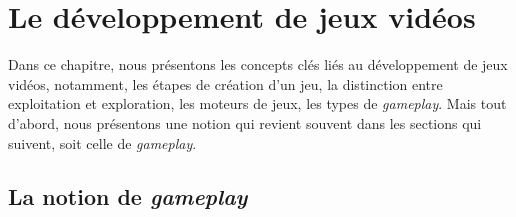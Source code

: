 \chapter{Le développement de jeux vidéos}

\label{chap.dev_jv}
Dans ce chapitre, nous pr\'esentons les concepts cl\'es
li\'es au d\'eveloppement de jeux vid\'eos, notamment, les \'etapes de
cr\'eation d'un jeu, la distinction entre exploitation et exploration,
les moteurs de jeux, les types de \emph{gameplay}.
%
Mais tout d'abord, nous pr\'esentons une notion qui revient
souvent dans les sections qui suivent, soit celle de \emph{gameplay}.



\section{La notion de \emph{gameplay}}

